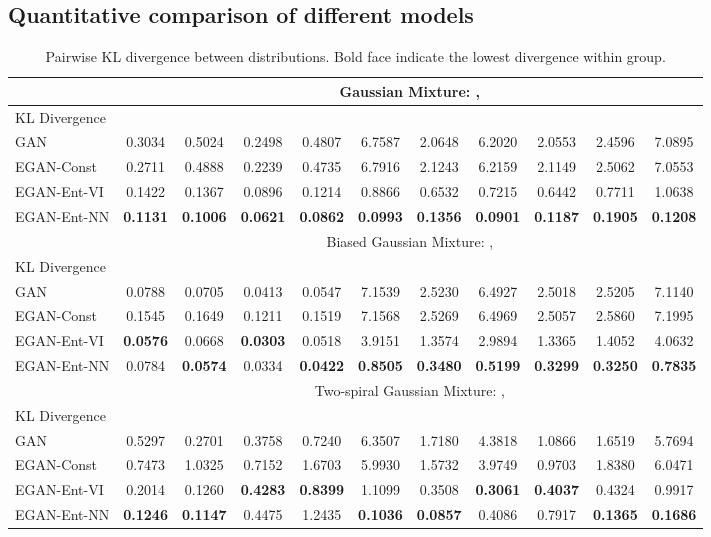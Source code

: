 \documentclass[a4paper]{article}
\begin{document}
\subsection{Quantitative comparison of different models}
\label{sec:quantify_synthetic}
\setlength\tabcolsep{3pt}
\begin{table}[h]
\scriptsize
\centering
\begin{tabular}{l|cccc|cccc|cc}
\toprule
& \multicolumn{10}{c}{Gaussian Mixture: \quad , \quad } \\
\midrule
KL Divergence &  &  &  &  &  &  &  &  &  &  \\
\midrule
GAN         & 0.3034 & 0.5024 & 0.2498 & 0.4807 & 6.7587 & 2.0648 & 6.2020 & 2.0553 & 2.4596 & 7.0895 \\
EGAN-Const  & 0.2711 & 0.4888 & 0.2239 & 0.4735 & 6.7916 & 2.1243 & 6.2159 & 2.1149 & 2.5062 & 7.0553 \\
EGAN-Ent-VI & 0.1422 & 0.1367 & 0.0896 & 0.1214 & 0.8866 & 0.6532 & 0.7215 & 0.6442 & 0.7711 & 1.0638 \\
EGAN-Ent-NN & \textbf{0.1131} & \textbf{0.1006} & \textbf{0.0621} & \textbf{0.0862} & \textbf{0.0993} & \textbf{0.1356} & \textbf{0.0901}   & \textbf{0.1187} & \textbf{0.1905} & \textbf{0.1208} \\
\bottomrule \toprule
& \multicolumn{10}{c}{Biased Gaussian Mixture: \quad , \quad } \\
\midrule
KL Divergence &  &  &  &  &  &  &  &  &  &  \\
\midrule
GAN         & 0.0788 & 0.0705 & 0.0413 & 0.0547 & 7.1539 & 2.5230 & 6.4927 & 2.5018 & 2.5205 & 7.1140 \\
EGAN-Const  & 0.1545 & 0.1649 & 0.1211 & 0.1519 & 7.1568 & 2.5269 & 6.4969 & 2.5057 & 2.5860 & 7.1995 \\
EGAN-Ent-VI & \textbf{0.0576} & 0.0668 & \textbf{0.0303} & 0.0518 & 3.9151 & 1.3574 & 2.9894 & 1.3365 & 1.4052 & 4.0632 \\
EGAN-Ent-NN & 0.0784 & \textbf{0.0574} & 0.0334 & \textbf{0.0422} & \textbf{0.8505} & \textbf{0.3480} & \textbf{0.5199} & \textbf{0.3299} & \textbf{0.3250} & \textbf{0.7835} \\
\bottomrule\toprule
&\multicolumn{10}{c}{Two-spiral Gaussian Mixture: \quad , \quad } \\
\midrule
KL Divergence &  &  &  &  &  &  &  &  &  &  \\
\midrule
GAN         & 0.5297 & 0.2701 & 0.3758 & 0.7240 & 6.3507 & 1.7180 & 4.3818 & 1.0866 & 1.6519 & 5.7694 \\
EGAN-Const  & 0.7473 & 1.0325 & 0.7152 & 1.6703 & 5.9930 & 1.5732 & 3.9749 & 0.9703 & 1.8380 & 6.0471 \\
EGAN-Ent-VI & 0.2014 & 0.1260 & \textbf{0.4283} & \textbf{0.8399} & 1.1099 & 0.3508 & \textbf{0.3061} & \textbf{0.4037} & 0.4324 & 0.9917 \\
EGAN-Ent-NN &\textbf{ 0.1246} & \textbf{0.1147} & 0.4475 & 1.2435 & \textbf{0.1036} & \textbf{0.0857} & 0.4086 & 0.7917 & \textbf{0.1365} & \textbf{0.1686} \\
\bottomrule
\end{tabular}
\caption{Pairwise KL divergence between distributions. Bold face indicate the lowest divergence within group.}
\label{tab:kl}
\end{table}
\end{document}
